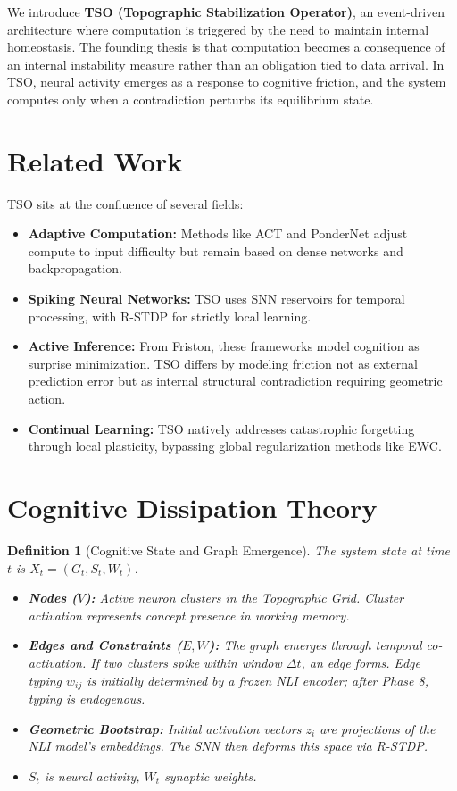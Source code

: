\documentclass{article}
\newtheorem{definition}{Definition}
\begin{document}
We introduce \textbf{TSO (Topographic Stabilization Operator)}, an event-driven architecture where computation is triggered by the need to maintain internal homeostasis. The founding thesis is that computation becomes a consequence of an internal instability measure rather than an obligation tied to data arrival. In TSO, neural activity emerges as a response to cognitive friction, and the system computes only when a contradiction perturbs its equilibrium state.

\section{Related Work}

TSO sits at the confluence of several fields:
\begin{itemize}
    \item \textbf{Adaptive Computation:} Methods like ACT and PonderNet adjust compute to input difficulty but remain based on dense networks and backpropagation.
    \item \textbf{Spiking Neural Networks:} TSO uses SNN reservoirs for temporal processing, with R-STDP for strictly local learning.
    \item \textbf{Active Inference:} From Friston, these frameworks model cognition as surprise minimization. TSO differs by modeling friction not as external prediction error but as internal structural contradiction requiring geometric action.
    \item \textbf{Continual Learning:} TSO natively addresses catastrophic forgetting through local plasticity, bypassing global regularization methods like EWC.
\end{itemize}

\section{Cognitive Dissipation Theory}

\begin{definition}[Cognitive State and Graph Emergence]
The system state at time $t$ is $X_t = (G_t, S_t, W_t)$.
\begin{itemize}
    \item \textbf{Nodes ($V$):} Active neuron clusters in the Topographic Grid. Cluster activation represents concept presence in working memory.
    \item \textbf{Edges and Constraints ($E, W$):} The graph emerges through temporal co-activation. If two clusters spike within window $\Delta t$, an edge forms. Edge typing $w_{ij}$ is initially determined by a frozen NLI encoder; after Phase 8, typing is endogenous.
    \item \textbf{Geometric Bootstrap:} Initial activation vectors $z_i$ are projections of the NLI model's embeddings. The SNN then deforms this space via R-STDP.
    \item $S_t$ is neural activity, $W_t$ synaptic weights.
\end{itemize}
\end{definition}
\end{document}
